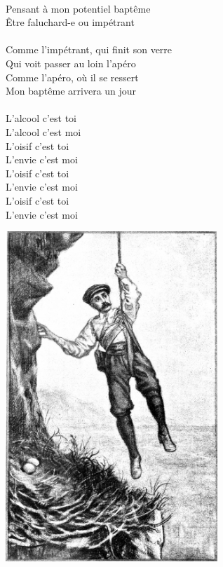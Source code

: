 \\Pensant à mon potentiel baptême
\\Être faluchard-e ou impétrant
\breakpage
\\\\Comme l'impétrant, qui finit son verre
\\Qui voit passer au loin l'apéro
\\Comme l'apéro, où il se ressert
\\Mon baptême arrivera un jour
\\\\L'alcool c'est toi
\\L'alcool c'est moi
\\L'oisif c'est toi
\\L'envie c'est moi
\\L'oisif c'est toi
\\L'envie c'est moi
\\L'oisif c'est toi
\\L'envie c'est moi

\vspace{1cm}
\begin{center}
\includegraphics[width=0.6\textwidth]{images/brev23.png}
\end{center}

\breakpage